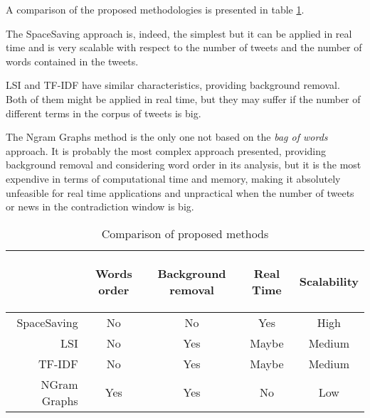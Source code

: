 A comparison of the proposed methodologies is presented in table
\ref{tab:methComp}.

The SpaceSaving approach is, indeed, the simplest but it can be applied in real
time and is very scalable with respect to the number of tweets and the number of
words contained in the tweets.

LSI and TF-IDF have similar characteristics, providing background removal. Both
of them might be applied in real time, but they may suffer if the number of
different terms in the corpus of tweets is big.

The Ngram Graphs method is the only one not based on the \emph{bag of words}
approach. It is probably the most complex approach presented, providing
background removal and considering word order in its analysis, but it is the most
expendive in terms of computational time and memory, making it absolutely unfeasible for
real time applications and unpractical when the number of tweets or news in the
contradiction window is big.

\begin{table}[htb]
	\centering
	\begin{tabular}{r|c|c|c|c}
		& \begin{sideways}Words order\end{sideways} & \begin{sideways}Background
			removal\end{sideways} & \begin{sideways}Real Time\end{sideways} &
				\begin{sideways}Scalability\end{sideways} \\
		\hline
		SpaceSaving & No & No & Yes & High \\
		LSI & No & Yes & Maybe & Medium \\
		TF-IDF & No & Yes & Maybe & Medium\\
		NGram Graphs & Yes & Yes & No & Low\\
		\end{tabular}
	\caption{Comparison of proposed methods}
	\label{tab:methComp}
\end{table}

